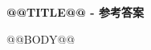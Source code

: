 \documentclass[11pt,a4paper]{ctexart}
\begin{document}
\begin{center}{\LARGE\bfseries @@TITLE@@ - 参考答案}\end{center}
\vspace{0.8em}
@@BODY@@
\end{document}
